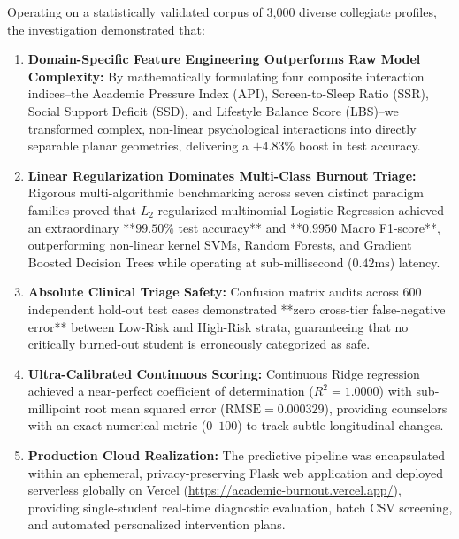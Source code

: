 \documentclass[12pt,a4paper,oneside]{report}
\begin{document}
Operating on a statistically validated corpus of 3,000 diverse collegiate profiles, the investigation demonstrated that:
\begin{enumerate}
    \item \textbf{Domain-Specific Feature Engineering Outperforms Raw Model Complexity:} By mathematically formulating four composite interaction indices--the Academic Pressure Index (API), Screen-to-Sleep Ratio (SSR), Social Support Deficit (SSD), and Lifestyle Balance Score (LBS)--we transformed complex, non-linear psychological interactions into directly separable planar geometries, delivering a $+4.83\%$ boost in test accuracy.
    \item \textbf{Linear Regularization Dominates Multi-Class Burnout Triage:} Rigorous multi-algorithmic benchmarking across seven distinct paradigm families proved that $L_2$-regularized multinomial Logistic Regression achieved an extraordinary **$99.50\%$ test accuracy** and **$0.9950$ Macro F1-score**, outperforming non-linear kernel SVMs, Random Forests, and Gradient Boosted Decision Trees while operating at sub-millisecond ($0.42\text{ms}$) latency.
    \item \textbf{Absolute Clinical Triage Safety:} Confusion matrix audits across 600 independent hold-out test cases demonstrated **zero cross-tier false-negative error** between Low-Risk and High-Risk strata, guaranteeing that no critically burned-out student is erroneously categorized as safe.
    \item \textbf{Ultra-Calibrated Continuous Scoring:} Continuous Ridge regression achieved a near-perfect coefficient of determination ($R^2 = 1.0000$) with sub-millipoint root mean squared error ($\text{RMSE} = 0.000329$), providing counselors with an exact numerical metric ($0$--$100$) to track subtle longitudinal changes.
    \item \textbf{Production Cloud Realization:} The predictive pipeline was encapsulated within an ephemeral, privacy-preserving Flask web application and deployed serverless globally on Vercel (\url{https://academic-burnout.vercel.app/}), providing single-student real-time diagnostic evaluation, batch CSV screening, and automated personalized intervention plans.
\end{enumerate}
\end{document}
